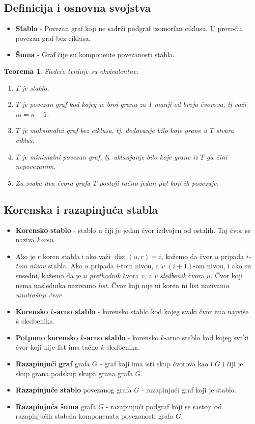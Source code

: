 \documentclass[a4paper,12pt]{article}
\numberwithin{algorithm}{section}
\theoremstyle{plain}
\newtheorem{theorem}{Teorema}[section]
\theoremstyle{definition}
\theoremstyle{remark}
\begin{document}
\subsection{Definicija i osnovna svojstva}
\begin{itemize}
    \item \textbf{Stablo} - Povezan graf koji ne sadrži podgraf izomorfan ciklusu. U prevodu, povezan graf bez ciklusa.
    \item \textbf{Šuma} - Graf čije su komponente povezanosti stabla.
\end{itemize}
\begin{theorem}
    Sledeće tvrdnje su ekvivalentne:
    \begin{enumerate}
        \item $T$ je stablo.
        \item $T$ je povezan graf kod kojeg je broj grana za 1 manji od broja čvorova, tj važi $m = n - 1$.
        \item $T$ je maksimalni graf bez ciklusa, tj. dodavanje bilo koje grane u $T$ stvara ciklus.
        \item $T$ je minimalni povezan graf, tj. uklanjanje bilo koje grane iz $T$ ga čini nepovezanim.
        \item Za svaka dva čvora grafa $T$ postoji tačno jedan put koji ih povezuje.
    \end{enumerate}
\end{theorem}
\subsection{Korenska i razapinjuća stabla}
\begin{itemize}
    \item \textbf{Korensko stablo} - stablo u čiji je jedan čvor izdvojen od ostalih. Taj čvor se naziva \textit{koren}.
    \item Ako je $r$ koren stabla i ako važi $\operatorname{dist}(u, r) = i$, kažemo da čvor $u$ pripada \textit{$i$-tom nivou} stabla. Ako $u$ pripada $i$-tom nivou, a $v$ $(i + 1)$-om nivou, i ako su susedni, kažemo da je $u$ \textit{prethodnik} čvora $v$, a $v$ \textit{sledbenik} čvora $u$. Čvor koji nema naslednika nazivamo \textit{list}. Čvor koji nije ni koren ni list nazivamo \textit{unutrašnji čvor}.
    \item \textbf{Korensko $k$-arno stablo} - korensko stablo kod kojeg svaki čvor ima najviše $k$ sledbenika.
    \item \textbf{Potpuno korensko $k$-arno stablo} - korensko $k$-arno stablo kod kojeg svaki čvor koji nije list ima tačno $k$ sledbenika.
    \item \textbf{Razapinjući graf} grafa $G$ - graf koji ima isti skup čvorova kao i $G$ i čiji je skup grana podskup skupa grana grafa $G$. 
    \item \textbf{Razapinjuće stablo} povezanog grafa $G$ - razapinjući graf koji je stablo.
    \item \textbf{Razapinjuća šuma} grafa $G$ - razapinjući podgraf koji se sastoji od razapinjućih stabala komponenata povezanosti grafa $G$.
\end{itemize}
\end{document}
